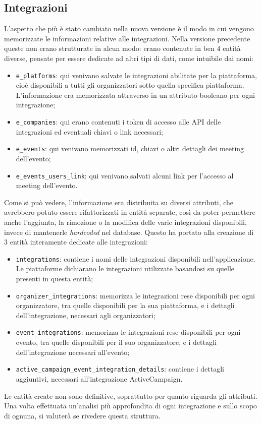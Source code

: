 \subsection{Integrazioni}
L'aspetto che più è stato cambiato nella nuova versione è il modo in cui vengono memorizzate le informazioni relative alle integrazioni. Nella versione precedente queste non erano strutturate in alcun modo: erano contenute in ben 4 entità diverse, pensate per essere dedicate ad altri tipi di dati, come intuibile dai nomi:
\begin{itemize}
	\item \verb|e_platforms|: qui venivano salvate le integrazioni abilitate per la piattaforma, cioè disponibili a tutti gli organizzatori sotto quella specifica piattaforma. L'informazione era memorizzata attraverso in un attributo booleano per ogni integrazione;
	\item \verb|e_companies|: qui erano contenuti i token di accesso alle API delle integrazioni ed eventuali chiavi o link necessari;
	\item \verb|e_events|: qui venivano memorizzati id, chiavi o altri dettagli dei meeting dell'evento;
	\item \verb|e_events_users_link|: qui venivano salvati alcuni link per l'accesso al meeting dell'evento.
\end{itemize}
Come si può vedere, l'informazione era distribuita su diversi attributi, che avrebbero potuto essere rifattorizzati in entità separate, così da poter permettere anche l'aggiunta, la rimozione o la modifica delle varie integrazioni disponibili, invece di mantenerle \emph{hardcoded} nel database. Questo ha portato alla creazione di 3 entità interamente dedicate alle integrazioni:
\begin{itemize}
	\item \verb|integrations|: contiene i nomi delle integrazioni disponibili nell'applicazione. Le piattaforme dichiarano le integrazioni utilizzate basandosi su quelle presenti in questa entità;
	\item \verb|organizer_integrations|: memorizza le integrazioni rese disponibili per ogni organizzatore, tra quelle disponibili per la sua piattaforma, e i dettagli dell'integrazione, necessari agli organizzatori;
	\item \verb|event_integrations|: memorizza le integrazioni rese disponibili per ogni evento, tra quelle disponibili per il suo organizzatore, e i dettagli dell'integrazione necessari all'evento;
	\item \verb|active_campaign_event_integration_details|: contiene i dettagli aggiuntivi, necessari all'integrazione ActiveCampaign.
\end{itemize}
Le entità create non sono definitive, soprattutto per quanto riguarda gli attributi. Una volta effettuata un'analisi più approfondita di ogni integrazione e sullo scopo di ognuna, si valuterà se rivedere questa struttura.


